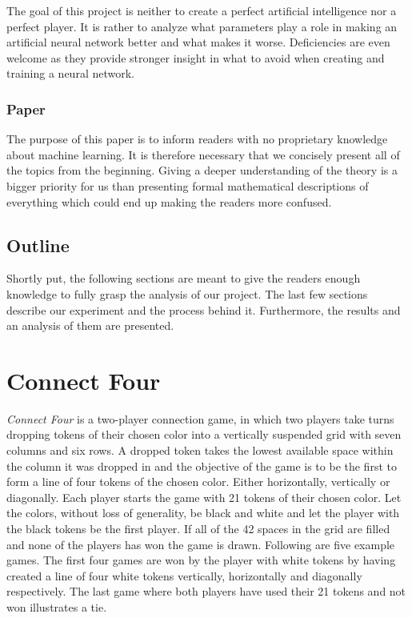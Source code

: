 \documentclass[titlepage]{article}
\begin{document}
The goal of this project is neither to create a perfect artificial intelligence nor a perfect player. It is rather to analyze what parameters play a role in making an artificial neural network better and what makes it worse. Deficiencies are even welcome as they provide stronger insight in what to avoid when creating and training a neural network. 

\subsubsection{Paper}

\vskip 0.2cm

The purpose of this paper is to inform readers with no proprietary knowledge about machine learning. It is therefore necessary that we concisely present all of the topics from the beginning. Giving a deeper understanding of the theory is a bigger priority for us than presenting formal mathematical descriptions of everything which could end up making the readers more confused. 

\subsection{Outline}

\vskip 0.2cm

Shortly put, the following sections are meant to give the readers enough knowledge to fully grasp the analysis of our project. The last few sections describe our experiment and the process behind it. Furthermore, the results and an analysis of them are presented.

\newpage

\section{Connect Four}

\vskip 0.5cm

\emph{Connect Four} is a two-player connection game, in which two players take turns dropping tokens of their chosen color into a vertically suspended grid with seven columns and six rows. A dropped token takes the lowest available space within the column it was dropped in and the objective of the game is to be the first to form a line of four tokens of the chosen color. Either horizontally, vertically or diagonally. Each player starts the game with 21 tokens of their chosen color. Let the colors, without loss of generality, be black and white and let the player with the black tokens be the first player. If all of the 42 spaces in the grid are filled and none of the players has won the game is drawn. Following are five example games. The first four games are won by the player with white tokens by having created a line of four white tokens vertically, horizontally and diagonally respectively. The last game where both players have used their 21 tokens and not won illustrates a tie.
\end{document}
